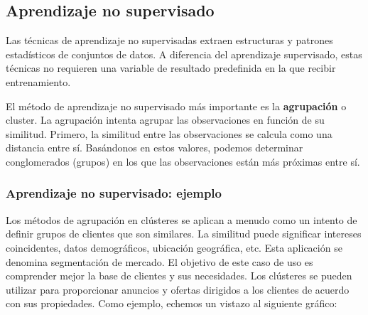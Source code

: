 \documentclass[
]{book}
\begin{document}
\hypertarget{aprendizaje-no-supervisado}{%
\subsection{Aprendizaje no supervisado}\label{aprendizaje-no-supervisado}}

Las técnicas de aprendizaje no supervisadas extraen estructuras y patrones estadísticos de conjuntos de datos. A diferencia del aprendizaje supervisado, estas técnicas no requieren una variable de resultado predefinida en la que recibir entrenamiento.

El método de aprendizaje no supervisado más importante es la \textbf{agrupación} o cluster. La agrupación intenta agrupar las observaciones en función de su similitud. Primero, la similitud entre las observaciones se calcula como una distancia entre sí. Basándonos en estos valores, podemos determinar conglomerados (grupos) en los que las observaciones están más próximas entre sí.

\hypertarget{aprendizaje-no-supervisado-ejemplo}{%
\subsubsection{Aprendizaje no supervisado: ejemplo}\label{aprendizaje-no-supervisado-ejemplo}}

Los métodos de agrupación en clústeres se aplican a menudo como un intento de definir grupos de clientes que son similares. La similitud puede significar intereses coincidentes, datos demográficos, ubicación geográfica, etc. Esta aplicación se denomina segmentación de mercado. El objetivo de este caso de uso es comprender mejor la base de clientes y sus necesidades. Los clústeres se pueden utilizar para proporcionar anuncios y ofertas dirigidos a los clientes de acuerdo con sus propiedades. Como ejemplo, echemos un vistazo al siguiente gráfico:
\end{document}
